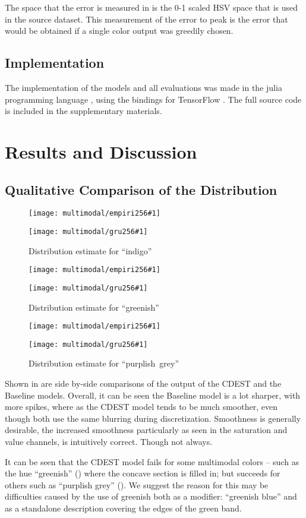 \documentclass[11pt,letterpaper]{article}
\newcommand{\parencite}{\cite}
\begin{document}
The space that the error is measured in is the 0-1 scaled HSV space that is used in the source dataset.
This measurement of the error to peak is the error that would be obtained if a single color output was greedily chosen.


\subsection{Implementation}
The implementation of the models and all evaluations was made in the julia programming language \parencite{Julia},
using the bindings for TensorFlow \parencite{tensorflow2015-whitepaper}.
The full source code is included in the supplementary materials.

\section{Results and Discussion}\label{sec:results-and-discussion}

\subsection{Qualitative Comparison of the Distribution}\label{resultsdistributions}


\newcommand{\multimodalfig}[2]{
	\begin{figure}
		\texttt{[image: multimodal/empiri256\#1]}
		
		\vspace{3mm}
		
		\texttt{[image: multimodal/gru256\#1]}	
		\caption{\label{fig#1} Distribution estimate for \mbox{``#2''}}
	\end{figure}
}

\multimodalfig{indigo}{indigo}
\multimodalfig{greenish}{greenish}
\multimodalfig{purplishgrey}{purplish grey}



Shown in  are side by-side comparisons of the output of the CDEST and the Baseline models.
Overall, it can be seen the Baseline model is a lot sharper, with more spikes,
where as the CDEST model tends to be much smoother, even though both use the same blurring during discretization.
Smoothness is generally desirable, the increased smoothness particularly as seen in the saturation and value channels, is intuitively correct.
Though not always.

It can be seen that the CDEST model fails for some multimodal colors -- such as the hue ``greenish'' () where the concave section is filled in;
but succeeds for others such as ``purplish grey'' ().
We suggest the reason for this may be difficulties caused by the use of greenish both as a modifier: ``greenish blue'' and as a standalone description covering the edges of the green band.
\end{document}

